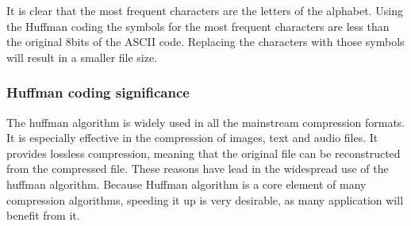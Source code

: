 It is clear that the most frequent characters are the letters of the alphabet. Using the Huffman coding the symbols for the most frequent characters are less than the 
original 8bits of the ASCII code. Replacing the characters with those symbols will result in a smaller file size.

\subsubsection{Huffman coding significance}

The huffman algorithm is widely used in all the mainstream compression formats. It is especially effective in the compression of images, text and audio files. It provides
lossless compression, meaning that the original file can be reconstructed from the compressed file. These reasons have lead in the widespread use of the huffman algorithm.
Because Huffman algorithm is a core element of many compression algorithms, speeding it up is very desirable, as many application will benefit from it. 
